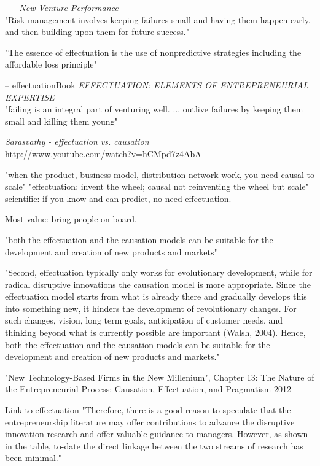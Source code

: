 ----
  \emph{New Venture Performance}\\
  
"Risk management involves keeping failures small and having them happen early, and
then building upon them for future success."

"The essence of effectuation is the use of
nonpredictive strategies including the affordable loss principle"

--
effectuationBook
\emph{EFFECTUATION: ELEMENTS OF ENTREPRENEURIAL EXPERTISE}\\

  "failing is an integral part of venturing well. ... 
    outlive failures by keeping them small and killing them young"



\emph{Sarasvathy - effectuation vs. causation}\\
  http://www.youtube.com/watch?v=hCMpd7z4AbA

  "when the product, business model, distribution network work, you need causal to scale"
  "effectuation: invent the wheel; causal not reinventing the wheel but scale"
  scientific: if you know and can predict, no need effectuation.
  
  Most value: bring people on board.
  
  
"both the effectuation and the causation models can be suitable for the
development and creation of new products and markets" \cite{effectuationCausationEffectuationAndPragmatism}


"Second, effectuation typically only works for evolutionary development, while for
radical disruptive innovations the causation model is more appropriate. Since the effectuation
model starts from what is already there and gradually develops this into something new, it
hinders the development of revolutionary changes. For such changes, vision, long term goals,
anticipation of customer needs, and thinking beyond what is currently possible are important
(Walsh, 2004). Hence, both the effectuation and the causation models can be suitable for the
development and creation of new products and markets." \cite{}

"New Technology-Based Firms in the New Millenium", Chapter 13:  The Nature of the Entrepreneurial Process: Causation, Effectuation, and Pragmatism
2012

Link to effectuation
"Therefore, there is a good reason to speculate
that the entrepreneurship literature may offer contributions to advance the disruptive innovation
research and offer valuable guidance to managers. However, as shown in the table, to-date the direct
linkage between the two streams of research has been minimal." \cite{managingDisruptiveInnovation}


